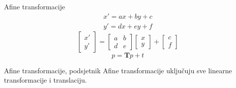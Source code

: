 \documentclass[9pt]{beamer}
\begin{document}
\begin{frame}{Afine transformacije}
	\begin{eqnarray}\nonumber
	x' = ax+by + c \\
	y' = dx+ey + f\nonumber
	\end{eqnarray}
	\begin{equation}
	\left[ \begin{array}{c} x' \\ y'  \end{array} \right] = 
	\left[ \begin{array}{cc}
	a & b  \\
	d & e  \end{array} \right] 	\left[ \begin{array}{c} x \\ y  \end{array} \right] + 
	\left[ \begin{array}{c} c \\ f  \end{array} \right]\nonumber
	\end{equation}
	\begin{equation}
	p = \mathbf{T} p +t \nonumber
	\end{equation}
	\begin{block}{Afine transformacije, podsjetnik}
		Afine transformacije uključuju sve linearne transformacije i translaciju.
	\end{block}
	
\end{frame}
\end{document}
